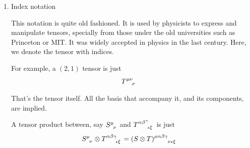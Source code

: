 \begin{enumerate}[(1)]
			Under this notation, there is no ambiguity. As long as the order of the covectors and vectors 
			are respected, we can swap them and indicate which slots belong to which.

			However, as you might have noticed, this notation is very cumbersome. I am intentionally
			showing you how inconvenient it is to use this notation. All those shit regarding 
			bases that you need to follow. However, mathematicians love this notation.
			They prefer it precisely because it is rigourous, and no confusion can happen.
			
			This notation is called the \textit{index-free} notation. It is index free because the 
			tensor itself has no index, only the component has. It is what we have been
			using so far to understand tensors. However, it has a few drawbacks.

			First, is that the expression of a tensor is very long and very cumbersome to write. It is
			easy to make mistakes. Second, is that you do not know the type of the tensor immediately just
			by looking at it. We need to specify that a tensor is of type $(k,l)$, which is separate
			from how we define the tensor itself. It is difficult to perform calculus on it, and 
			it's just inconvenient. Contraction operations on tensors using this notation is hard.
			Manipulating things is diffilcult. For example, showing that
			\[
				S\otimes T \neq T\otimes S
			\]
			explicity is cumbersome, since we need to define everything.

			However, this is very common in pure mathematics. It is inconvenient, but rigourous. It is unambigous,
			and it is exact.
		\item Index notation

			This notation is quite old fashioned. It is used by 
			physicists to express and  manipulate tensors, specially from those
			under the old universities such as Princeton or MIT. It was widely
			accepted in physics in the last century. Here, we denote the tensor with indices.

			For example, a $(2,1)$ tensor is just 
			\[
				\tensor{T}{^{\mu\nu}_{\sigma}}
			\]

			That's the tensor itself. All the basis that accompany it, and its components, are implied. 

			A tensor product between, say $\tensor{S}{^\mu_\nu}$ and $\tensor{T}{^{\alpha\beta^\gamma}_{\epsilon\xi}}$
			is just
			\[
				\tensor{S}{^\mu_\nu}
				\otimes
				\tensor{T}{^{\alpha\beta\gamma}_{\epsilon\xi}}
				=
				\tensor{(S\otimes T)}{^{\mu\alpha\beta\gamma}_{\nu\epsilon\xi}}
			\]


\end{enumerate}

